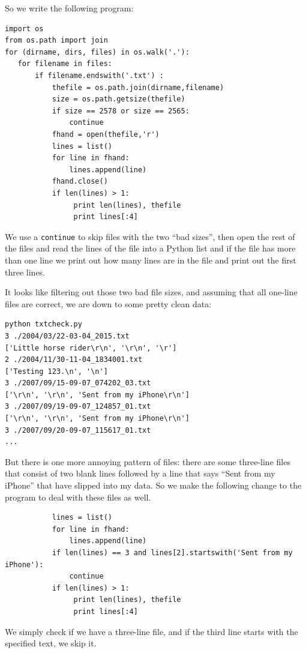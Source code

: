 \documentclass[11pt]{book}
\begin{document}
So we write the following program:

\beforeverb
\begin{verbatim}
import os
from os.path import join
for (dirname, dirs, files) in os.walk('.'):
   for filename in files:
       if filename.endswith('.txt') :
           thefile = os.path.join(dirname,filename)
           size = os.path.getsize(thefile)
           if size == 2578 or size == 2565:
               continue
           fhand = open(thefile,'r')
           lines = list()
           for line in fhand:
               lines.append(line)
           fhand.close()
           if len(lines) > 1:
                print len(lines), thefile
                print lines[:4]
\end{verbatim}
\afterverb
%
We use a {\tt continue} to skip files with the two 
``bad sizes'', then open the rest of the files
and read the lines of the file into a Python list
and if the file has more than one line we print
out how many lines are in the file and print out
the first three lines.

It looks like filtering out those two bad file sizes, and assuming
that all one-line files are correct, we are down to some pretty clean
data:

\beforeverb
\begin{verbatim}
python txtcheck.py 
3 ./2004/03/22-03-04_2015.txt
['Little horse rider\r\n', '\r\n', '\r']
2 ./2004/11/30-11-04_1834001.txt
['Testing 123.\n', '\n']
3 ./2007/09/15-09-07_074202_03.txt
['\r\n', '\r\n', 'Sent from my iPhone\r\n']
3 ./2007/09/19-09-07_124857_01.txt
['\r\n', '\r\n', 'Sent from my iPhone\r\n']
3 ./2007/09/20-09-07_115617_01.txt
...
\end{verbatim}
\afterverb
%
But there is one more annoying pattern of files: 
there are some three-line files that consist of
two blank lines followed by a line that says
``Sent from my iPhone'' that have slipped 
into my data.   So we make the following change
to the program to deal with these files as well.

\beforeverb
\begin{verbatim}
           lines = list()
           for line in fhand:
               lines.append(line)
           if len(lines) == 3 and lines[2].startswith('Sent from my iPhone'):
               continue
           if len(lines) > 1:
                print len(lines), thefile
                print lines[:4]
\end{verbatim}
\afterverb
%
We simply check if we have a three-line file, and if the third 
line starts with the specified text, we skip it.
\end{document}
